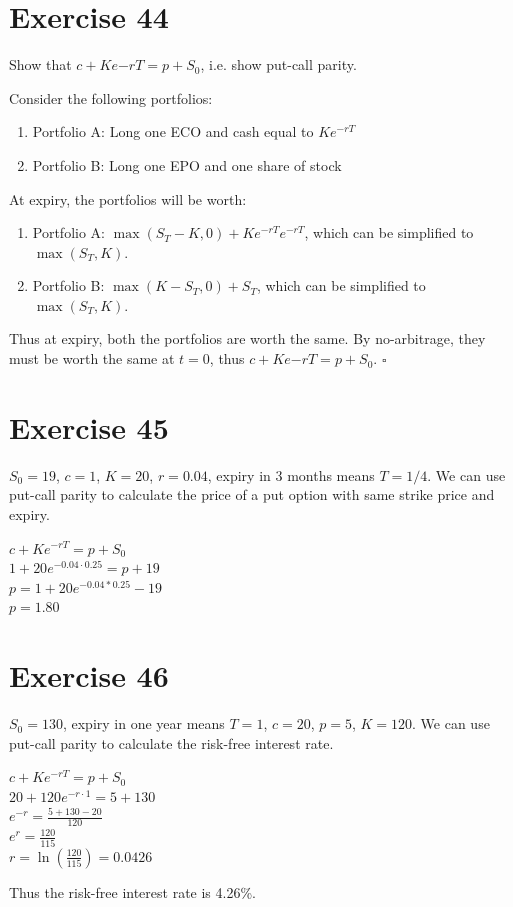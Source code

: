\documentclass{article}
\begin{document}
\section*{Exercise 44}
Show that $c + Ke{-rT} = p + S_0$, i.e. show put-call parity.
\begin{flushleft}
    Consider the following portfolios:
    \begin{enumerate}
        \item Portfolio A: Long one ECO and cash equal to $Ke^{-rT}$
        \item Portfolio B: Long one EPO and one share of stock
    \end{enumerate}
    At expiry, the portfolios will be worth:
    \begin{enumerate}
        \item Portfolio A: $\max(S_T - K, 0) + Ke^{-rT}e^{-rT}$, which can be simplified to $\max(S_T, K)$.
        \item Portfolio B: $\max(K - S_T, 0) + S_T$, which can be simplified to $\max(S_T, K)$.
    \end{enumerate}
    Thus at expiry, both the portfolios are worth the same. By no-arbitrage, they must be worth the same at $t=0$, thus $c + Ke{-rT} = p + S_0$. $\square$
\end{flushleft}

\section*{Exercise 45}
\begin{flushleft}
    $S_0 = 19$, $c=1$, $K=20$, $r=0.04$, expiry in 3 months means $T = 1/4$.
    We can use put-call parity to calculate the price of a put option with same strike price and expiry.
    \begin{center}
        $c + Ke^{-rT} = p + S_0$ \\
        $1 + 20e^{-0.04 \cdot 0.25} = p + 19$ \\
        $p = 1 + 20e^{-0.04 * 0.25} - 19$ \\
        $p = 1.80$
    \end{center}
\end{flushleft}

\section*{Exercise 46}
\begin{flushleft}
    $S_0 = 130$, expiry in one year means $T=1$, $c = 20$, $p=5$, $K = 120$.
    We can use put-call parity to calculate the risk-free interest rate.
    \begin{center}
        $c + Ke^{-rT} = p + S_0$ \\
        $20 + 120e^{-r \cdot 1} = 5 + 130$ \\
        $e^{-r} = \frac{5+130-20}{120}$ \\
        $e^r = \frac{120}{115}$ \\
        $r = \ln(\frac{120}{115}) = 0.0426$ \\
    \end{center}
    Thus the risk-free interest rate is 4.26\%.
\end{flushleft}
\end{document}
